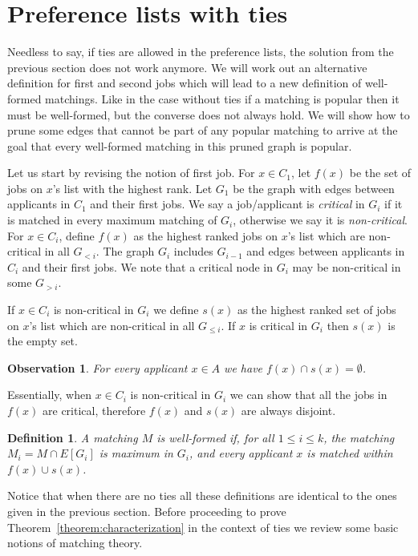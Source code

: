 \documentclass[11pt]{article}
\newcommand{\first}{f}
\newcommand{\second}{s}
\newtheorem{definition}{Definition}
\newtheorem{observation}{Observation}
\begin{document}
\section{Preference lists with ties}

Needless to say, if ties are allowed in the preference lists, the solution from the previous section does not work anymore. We will work out an alternative definition for first and second jobs which will lead to a new definition of well-formed matchings. Like in the case without ties if a matching is popular then it must be well-formed, but the converse does not always hold. We will show how to prune some edges that cannot be part of any popular matching to arrive at the goal that every well-formed matching in this pruned graph is popular.

Let us start by revising the notion of first job. For $x \in C_1$, let $\first(x)$ be the set of jobs on $x$'s list with the highest rank. Let $G_1$ be the graph with edges between applicants in $C_1$ and their first jobs. We say a job/applicant is \emph{critical} in $G_i$ if it is matched in every maximum matching of $G_i$, otherwise we say it is \emph{non-critical}. For $x \in C_i$, define $\first(x)$ as the highest ranked jobs on $x$'s list which are non-critical in all $G_{< i}$. The graph $G_i$ includes $G_{i-1}$ and edges between applicants in $C_i$ and their first jobs. We note that a critical node in $G_i$ may be non-critical in some $G_{>i}$.

If $x \in C_i$ is non-critical in $G_i$ we define $\second(x)$ as the highest ranked set of jobs on $x$'s list which are non-critical in all $G_{\leq i}$. If $x$ is critical in $G_i$ then $\second(x)$ is the empty set.

\begin{observation} For every applicant $x \in A$ we have $\first(x) \cap \second(x) = \emptyset$.
\end{observation}

Essentially, when $x \in C_i$ is non-critical in $G_i$ we can show that all the jobs in $\first(x)$ are critical, therefore $\first(x)$ and $\second(x)$ are always disjoint.

\begin{definition}
A matching $M$ is \emph{well-formed} if, for all $1 \leq i \leq k$, the matching $M_i = M \cap E[G_i]$ is maximum in $G_i$, and every applicant $x$ is matched within $\first(x) \cup \second(x)$. 
\end{definition}

Notice that when there are no ties all these definitions are identical to the ones given in the previous section. Before proceeding to prove Theorem~\ref{theorem:characterization} in the context of ties we review some basic notions of matching theory.
\end{document}
